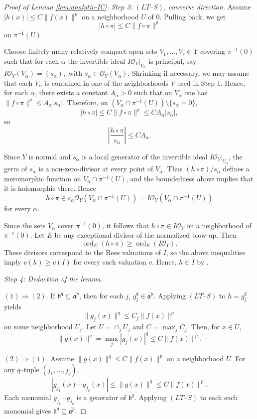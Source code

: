\documentclass[12pt]{amsart}
\newcommand{\ord}{\operatorname{\mathrm{ord}}}
\renewcommand{\a}{\mathfrak{a}}
\renewcommand{\b}{\mathfrak{b}}
\newcommand{\cO}{\mathcal{O}}
\theoremstyle{plain}
\theoremstyle{definition}
\numberwithin{equation}{section}
\begin{document}
\begin{proof}[Proof of Lemma \ref{lem:analytic-IC}]
	\medskip
	\noindent\emph{Step 3: $(LT\text{--}S)$, converse direction.}
 Assume $|h(x)| \le C\|f(x)\|^p$ on a neighborhood $U$ of $0$. Pulling back, we get
 $$
 |h\circ\pi| \le C\|f\circ\pi\|^p
 $$
 on $\pi^{-1}(U)$.
 
 Choose finitely many relatively compact open sets $V_1,\dots,V_r\Subset Y$ covering $\pi^{-1}(0)$ such that for each $\alpha$ the invertible ideal $I\cO_Y|_{V_\alpha}$ is principal, say
 $
 I\cO_Y(V_\alpha)=(s_\alpha),
 $
 with $s_\alpha\in \cO_Y(V_\alpha)$. Shrinking if necessary, we may assume that each $V_\alpha$ is contained in one of the neighborhoods $V$ used in Step 1. Hence, for each $\alpha$, there exists a constant $A_\alpha>0$ such that on $V_\alpha$ one has
 $
 \|f\circ\pi\|^p \le A_\alpha |s_\alpha|.
 $
 Therefore, on $(V_\alpha\cap \pi^{-1}(U))\setminus \{s_\alpha=0\}$,
 $$
 |h\circ\pi| \le C\|f\circ\pi\|^p \le C A_\alpha |s_\alpha|,
 $$
 so
 $$
 \left|\frac{h\circ\pi}{s_\alpha}\right| \le C A_\alpha.
 $$
 
 Since $Y$ is normal and $s_\alpha$ is a local generator of the invertible ideal $I\cO_Y|_{V_\alpha}$, the germ of $s_\alpha$ is a non-zero-divisor at every point of $V_\alpha$. Thus $(h\circ\pi)/s_\alpha$ defines a meromorphic function on $V_\alpha\cap \pi^{-1}(U)$, and the boundedness above implies that it is holomorphic there. Hence
 $$
 h\circ\pi \in s_\alpha \cO_Y(V_\alpha\cap \pi^{-1}(U))
 = I\cO_Y(V_\alpha\cap \pi^{-1}(U))
 $$
 for every $\alpha$.
 
 Since the sets $V_\alpha$ cover $\pi^{-1}(0)$, it follows that
 $
 h\circ\pi \in I\cO_Y
 $
 on a neighborhood of $\pi^{-1}(0)$.
 Let $E$ be any exceptional divisor of the normalized blow-up. Then
 $$
 \ord_E(h\circ\pi)\ge \ord_E(I\cO_Y).
 $$
 These divisors correspond to the Rees valuations of $I$, so the above inequalities imply $v(h)\ge v(I)$ for every such valuation $v$. Hence, $h\in \overline{I}$ by .
 
	\medskip
	\noindent\emph{Step 4: Deduction of the lemma.}
	
	\smallskip
	\noindent$(1)\Rightarrow(2)$.
	If $\b^q\subseteq \overline{\a^p}$, then for each $j$,
	$g_j^q\in\overline{\a^p}$.
	Applying $(LT\text{--}S)$ to $h=g_j^q$ yields
	\[
	\|g_j(x)\|^q\le C_j\|f(x)\|^p
	\]
	on some neighborhood $U_j$.
	Let $U=\cap_jU_j$ and $C=\max_jC_j$.
	Then, for $x\in U$,
	\[
	\|g(x)\|^q=\max_j|g_j(x)|^q\le C\|f(x)\|^p.
	\]
	
	\smallskip
	\noindent$(2)\Rightarrow(1)$.
	Assume $\|g(x)\|^q\le C\|f(x)\|^p$ on a neighborhood $U$.
	For any $q$--tuple $(j_1,\dots,j_q)$,
	\[
	|g_{j_1}(x)\cdots g_{j_q}(x)|
	\le \|g(x)\|^q
	\le C\|f(x)\|^p.
	\]
	Each monomial $g_{j_1}\cdots g_{j_q}$ is a generator of $\b^q$.
	Applying $(LT\text{--}S)$ to each such monomial gives
	$\b^q\subseteq \overline{\a^p}$.
\end{proof}
\end{document}

